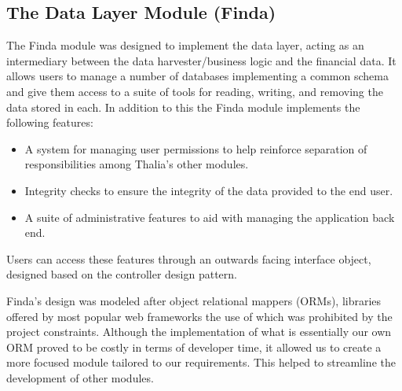 \documentclass[main.tex]{subfiles}
\begin{document}
\subsection{The Data Layer Module (Finda)}

The Finda module was designed to implement the data layer, acting as an intermediary between the data harvester/business logic and the financial data. It allows users to manage a number of databases implementing a common schema and give them access to a suite of tools for reading, writing, and removing the data stored in each. In addition to this the Finda module implements the following features:

\begin{itemize}
\item A system for managing user permissions to help reinforce separation of responsibilities among Thalia's other modules. 
\item Integrity checks to ensure the integrity of the data provided to the end user.
\item A suite of administrative features to aid with managing the application back end.
\end{itemize}

Users can access these features through an outwards facing interface object, designed based on the controller design pattern.

Finda's design was modeled after object relational mappers (ORMs), libraries offered by most popular web frameworks the use of which was prohibited by the project constraints. Although the implementation of what is essentially our own ORM proved to be costly in terms of developer time, it allowed us to create a more focused module tailored to our requirements. This helped to streamline the development of other modules.
\end{document}
